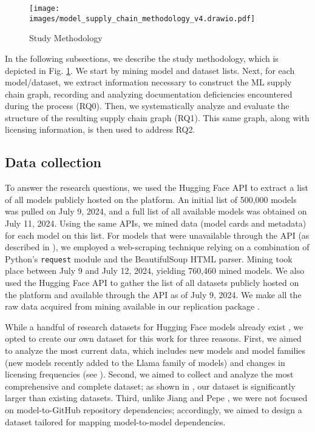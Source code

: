 \begin{figure}[ht!]
\centering
\texttt{[image: images/model\_supply\_chain\_methodology\_v4.drawio.pdf]}
\caption{Study Methodology} %
\label{fig:methodology}
\end{figure}

In the following subsections, we describe the study methodology, which is depicted in Fig. \ref{fig:methodology}. We start by mining model and dataset lists.  Next, for each model/dataset, we extract information necessary to construct the ML supply chain graph, recording and analyzing documentation deficiencies encountered during the process (RQ0). Then, we systematically analyze and evaluate the structure of the resulting supply chain graph (RQ1).  %
This same graph, along with licensing information, is then used to address RQ2.

\subsection{Data collection}
To answer the research questions, we used the Hugging Face API to extract a list of all models publicly hosted on the platform.  An initial list of 500,000 models was pulled on July 9, 2024, and a full list of all available models was obtained on July 11, 2024.  Using the same APIs, we mined data (model cards and metadata) for each model on this list.  For models that were unavailable through the API (as described in ), we employed a web-scraping technique relying on a combination of Python's \texttt{request} module and the BeautifulSoup HTML parser.  Mining took place between July 9 and July 12, 2024, yielding 760,460 mined models. We also used the Hugging Face API to gather the list of all datasets publicly hosted on the platform and available through the API as of July 9, 2024.  We make all the raw data acquired from mining available in our replication package \cite{anonymous_repo}. 

While a handful of research datasets for Hugging Face models already exist \cite{jiang2024peatmoss, jiang2023ptmtorrent}, we opted to create our own dataset for this work for three reasons. First, we aimed to analyze the most current data, which includes new models and model families (\eg new models recently added to the Llama family of models) %
and changes in licensing frequencies (see ). Second, we aimed to collect and analyze the most comprehensive and complete dataset; as shown in , our dataset is significantly larger than existing datasets. %
Third, unlike Jiang \etal \cite{jiang2024peatmoss} and Pepe \etal \cite{pepe2024hugging}, %
we were not focused on model-to-GitHub repository dependencies; accordingly, we aimed to design a dataset tailored for mapping model-to-model dependencies.%

